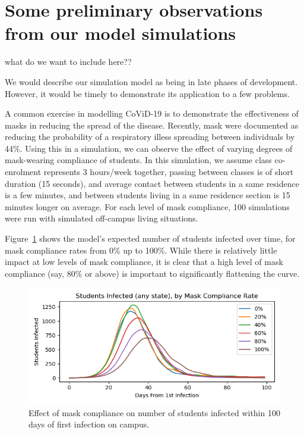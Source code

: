 \documentclass[fleqn,10pt]{SelfArx} %
\newcommand{\ed}[1]{{\color{blue} #1}}
\begin{document}
\section{Some preliminary observations from our model simulations}
\label{sec:prelimresults}

\ed{what do we want to include here??}

We would describe our simulation model as being in late phases of development.  However, it would be timely to demonstrate its application to a few problems.  

A common exercise in modelling CoViD-19 is to demonstrate the effectiveness of masks in reducing the spread of the disease.  Recently, mask were documented as reducing the probability of a respiratory illess spreading between individuals by 44\%\cite{chu_physical_2020}.  Using this in a simulation, we can observe the effect of varying degrees of mask-wearing compliance of students.  In this simulation, we assume class co-enrolment represents 3 hours/week together, passing between classes is of short duration (15 seconds), and average contact between students in a same residence is a few minutes, and between students living in a same residence section is 15 minutes longer on average.   For each level of mask compliance, 100 simulations were run with simulated off-campus living situations.  

Figure~\ref{fig:compliance} shows the model's expected number of students infected over time, for mask compliance rates from 0\% up to 100\%.  While there is relatively little impact at low levels of mask compliance, it is clear that a high level of mask compliance (say, 80\% or above) is important to significantly flattening the curve. 

\begin{figure}[ht]\centering %
	\includegraphics[width=\linewidth]{mask_compliance}
	\caption{Effect of mask compliance on number of students infected within 100 days of first infection on campus.}
	\label{fig:compliance}
\end{figure}
\end{document}
